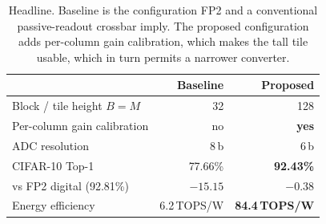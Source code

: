 \begin{table}[t]
\centering
\caption{Headline. Baseline is the configuration FP2 and a conventional passive-readout crossbar imply. The proposed configuration adds per-column gain calibration, which makes the tall tile usable, which in turn permits a narrower converter.}
\label{tab:headline}
\begin{tabular}{lrr}
\toprule
 & Baseline & Proposed \\
\midrule
Block / tile height $B{=}M$ & 32 & 128 \\
Per-column gain calibration & no & \textbf{yes} \\
ADC resolution & 8\,b & 6\,b \\
\midrule
CIFAR-10 Top-1 & 77.66\% & \textbf{92.43\%} \\
vs FP2 digital (92.81\%) & $-15.15$ & $\mathbf{-0.38}$ \\
Energy efficiency & 6.2\,TOPS/W & \textbf{84.4\,TOPS/W} \\
\bottomrule
\end{tabular}
\end{table}

